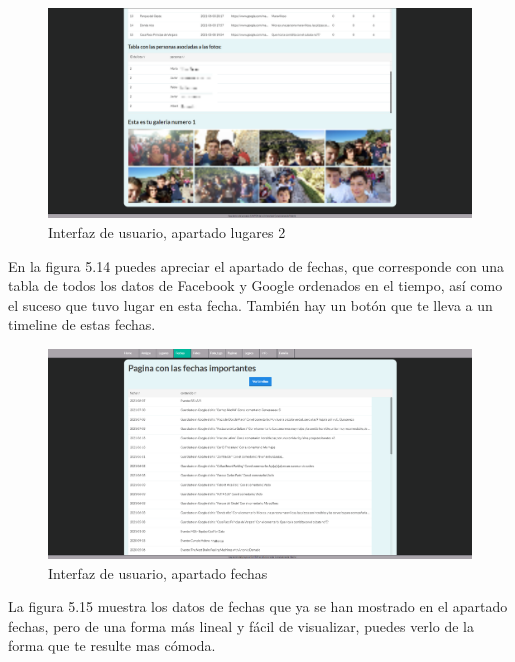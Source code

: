\begin{figure}
	\begin{center}
		\includegraphics[scale=0.3]{Imagenes/Fuentes/InterfazLugares2.png} \caption{Interfaz de usuario, apartado lugares 2}
		\label{WebAplication4}
	\end{center}
\end{figure}
En la figura 5.14 puedes apreciar el apartado de fechas, que corresponde con una tabla de todos los datos de Facebook y Google ordenados en el tiempo, así como el suceso que tuvo lugar en esta fecha. También hay un botón que te lleva a un timeline de estas fechas.
\begin{figure}
	\begin{center}
		\includegraphics[scale=0.3]{Imagenes/Fuentes/InterfazFechas.png} \caption{Interfaz de usuario, apartado fechas}
		\label{WebAplication5}
	\end{center}
\end{figure}
La figura 5.15 muestra los datos de fechas que ya se han mostrado en el apartado fechas, pero de una forma más lineal y fácil de visualizar, puedes verlo de la forma que te resulte mas cómoda.
